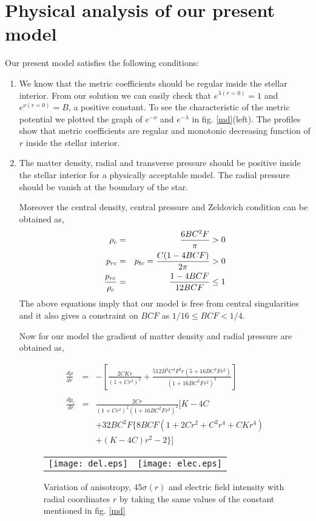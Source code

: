 \documentclass[preprintnumbers,amsmath,amssymb,floatfix,9pt,prd,twocolumn,
superscriptaddress,nofootinbib]{revtex4}
\begin{document}
\section{Physical analysis of our present model}
Our present model satisfies the following conditions:

\begin{enumerate}
\item We know that the metric coefficients should be regular inside the stellar interior. From our solution we can easily check that $e^{\lambda(r=0)}=1$ and $e^{\nu(r=0)}=B$, a positive constant. To see the characteristic of the metric potential we plotted the graph of $e^{-\nu}$ and $e^{-\lambda}$ in fig. \ref{md}(left). The profiles show that metric coefficients are regular and monotonic decreasing function of $r$ inside the stellar interior.

\item The matter density, radial and transverse pressure should be positive inside the stellar interior for a physically acceptable model. The radial pressure should be vanish at the boundary of the star.

Moreover the central density, central pressure and Zeldovich condition can be obtained as,
\begin{eqnarray*}
\rho_c &=& \frac{6BC^{2}F}{\pi}>0\\
p_{rc} &=& p_{tc}=\frac{C(1-4BCF)}{2\pi}>0\\
{p_{rc} \over \rho_c} &=& \frac{1-4BCF}{12BCF} \le 1
\end{eqnarray*}
The above equations imply that our model is free from central singularities and it also gives a constraint on $BCF$ as $1/16 \le BCF < 1/4$.

Now for our model the gradient of matter density and radial pressure are obtained as,

\begin{eqnarray}
\frac{d\rho}{dr} &=& -\left[\frac{2 C K r}{(1 + C r^2)^2}+\frac{512 B^2 C^4 F^2 r (5 + 16 B C^2 F r^2)}{(1 + 16 B C^2 F r^2)^3}\right]\nonumber\\
\\
\frac{dp_r}{dr} &=& \frac{2 C r} {(1 + C r^2)^2 (1 + 16 B C^2 F r^2)^2}\big[K-4C \nonumber\\
&&+32BC^{2}F\{8BCF(1+2Cr^{2}+C^{2}r^{4}+CKr^{4})\nonumber\\
&&+(K-4C)r^{2}-2\} \big]
\end{eqnarray}


\begin{figure*}[thbp]
\begin{center}
\begin{tabular}{rl}
\texttt{[image: del.eps]}&
\texttt{[image: elec.eps]}\\
\end{tabular}
\end{center}
\caption{Variation of anisotropy, $45\sigma (r)$ and electric field intensity with radial coordinates $r$ by taking the same values of the constant mentioned in fig. \ref{md}}\label{dp}
\end{figure*}


\end{enumerate}
\end{document}
